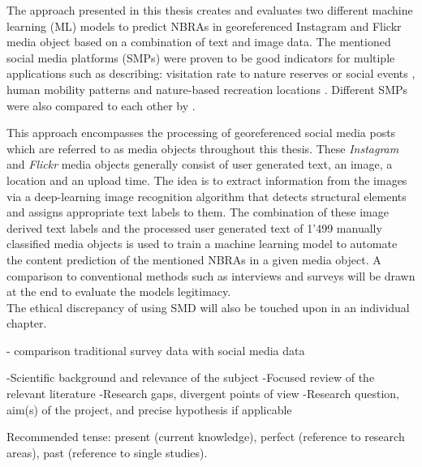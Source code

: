 \newline
The approach presented in this thesis creates and evaluates two different machine learning (ML) models to predict NBRAs in georeferenced Instagram and Flickr media object based on a combination of text and image data. The mentioned social media platforms (SMPs) were proven to be good indicators for multiple applications such as describing: visitation rate to nature reserves \parencite{Heikinheimo2017, Keeler2015, Wood2013} or social events \parencite{Pettersson2011}, human mobility patterns \parencite{Barchiesi2015, Grossenbacher2014} and nature-based recreation locations \parencite{XY}. Different SMPs were also compared to each other by \parencite{Tenkanen2017}.  



This approach encompasses the processing of georeferenced social media posts which are referred to as media objects throughout this thesis. These \textit{Instagram} and \textit{Flickr} media objects generally consist of user generated text, an image, a location and an upload time. The idea is to extract information from the images via a deep-learning image recognition algorithm that detects structural elements and assigns appropriate text labels to them. The combination of these image derived text labels and the processed user generated text of 1'499 manually classified media objects is used to train a machine learning model to automate the content prediction of the mentioned NBRAs in a given media object. A comparison to conventional methods such as interviews and surveys will be drawn at the end to evaluate the models legitimacy. \\
The ethical discrepancy of using SMD will also be touched upon in an individual chapter.

- comparison traditional survey data with social media data


   -Scientific background and relevance of the subject
    -Focused review of the relevant literature
    -Research gaps, divergent points of view
    -Research question, aim(s) of the project, and precise hypothesis if applicable

Recommended tense: present (current knowledge), perfect (reference to research areas), past (reference to single studies).